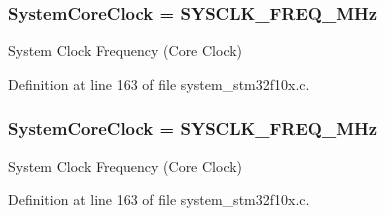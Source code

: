 \subsubsection[{\texorpdfstring{System\+Core\+Clock}{SystemCoreClock}}]{ System\+Core\+Clock = {\bf S\+Y\+S\+C\+L\+K\+\_\+\+F\+R\+E\+Q\+\_\+M\+Hz}}\hypertarget{group___s_t_m32_f10x___system___private___variables_gaa3cd3e43291e81e795d642b79b6088e6}{}\label{group___s_t_m32_f10x___system___private___variables_gaa3cd3e43291e81e795d642b79b6088e6}
System Clock Frequency (Core Clock) 

Definition at line 163 of file system\+\_\+stm32f10x.\+c.

\subsubsection[{\texorpdfstring{System\+Core\+Clock}{SystemCoreClock}}]{ System\+Core\+Clock = {\bf S\+Y\+S\+C\+L\+K\+\_\+\+F\+R\+E\+Q\+\_\+M\+Hz}}\hypertarget{group___s_t_m32_f10x___system___private___variables_gaa3cd3e43291e81e795d642b79b6088e6}{}\label{group___s_t_m32_f10x___system___private___variables_gaa3cd3e43291e81e795d642b79b6088e6}
System Clock Frequency (Core Clock) 

Definition at line 163 of file system\+\_\+stm32f10x.\+c.

